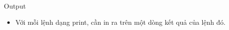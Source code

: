 Output
\begin{itemize}
	\item Với mỗi lệnh dạng print, cần in ra trên một dòng kết quả của lệnh đó.
\end{itemize}